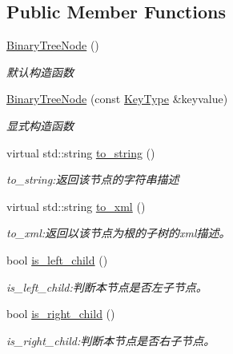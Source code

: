 \subsection*{Public Member Functions}
\begin{DoxyCompactItemize}
\item 
\hyperlink{struct_introduction_to_algorithm_1_1_tree_algorithm_1_1_binary_tree_node_a8e8de673785852b0c091916f5fb64e78}{Binary\+Tree\+Node} ()
\begin{DoxyCompactList}\small\item\em 默认构造函数 \end{DoxyCompactList}\item 
\hyperlink{struct_introduction_to_algorithm_1_1_tree_algorithm_1_1_binary_tree_node_a8382a5ddc6f9c8cbfeacd0f0163d8c4d}{Binary\+Tree\+Node} (const \hyperlink{struct_introduction_to_algorithm_1_1_tree_algorithm_1_1_binary_tree_node_adbd8539e7a907c3a8fe7a8b79e7032e8}{Key\+Type} \&keyvalue)
\begin{DoxyCompactList}\small\item\em 显式构造函数 \end{DoxyCompactList}\item 
virtual std\+::string \hyperlink{struct_introduction_to_algorithm_1_1_tree_algorithm_1_1_binary_tree_node_ae552fb23243e499a60ef73375fabe239}{to\+\_\+string} ()
\begin{DoxyCompactList}\small\item\em to\+\_\+string\+:返回该节点的字符串描述 \end{DoxyCompactList}\item 
virtual std\+::string \hyperlink{struct_introduction_to_algorithm_1_1_tree_algorithm_1_1_binary_tree_node_a694d14f0b33f2f052f11148ecbe1684e}{to\+\_\+xml} ()
\begin{DoxyCompactList}\small\item\em to\+\_\+xml\+:返回以该节点为根的子树的{\ttfamily xml}描述。 \end{DoxyCompactList}\item 
bool \hyperlink{struct_introduction_to_algorithm_1_1_tree_algorithm_1_1_binary_tree_node_a54a90606ceb604a1a4d01056429a8a06}{is\+\_\+left\+\_\+child} ()
\begin{DoxyCompactList}\small\item\em is\+\_\+left\+\_\+child\+:判断本节点是否左子节点。 \end{DoxyCompactList}\item 
bool \hyperlink{struct_introduction_to_algorithm_1_1_tree_algorithm_1_1_binary_tree_node_a34c1912a2a7e9caa7a67354218fd7640}{is\+\_\+right\+\_\+child} ()
\begin{DoxyCompactList}\small\item\em is\+\_\+right\+\_\+child\+:判断本节点是否右子节点。 \end{DoxyCompactList}\end{DoxyCompactItemize}
